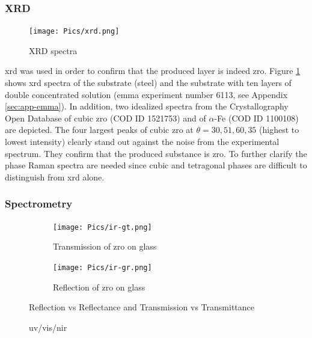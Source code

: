\subsubsection{XRD}
\begin{figure}
	\centering
	\texttt{[image: Pics/xrd.png]}
	\caption{XRD spectra}
	\label{fig:xrd}
\end{figure}

\Gls{xrd} was used in order to confirm that the produced layer is indeed \gls{zro}. 
Figure \ref{fig:xrd} shows \gls{xrd} spectra of the substrate (steel) and 
the substrate with ten layers of double concentrated solution (\gls{emma} experiment number 6113, see Appendix \ref{sec:app-emma}).
In addition, two idealized spectra from the Crystallography Open Database of cubic \gls{zro} (COD ID 1521753\cite{gkatz1971xray}) and of $\alpha$-Fe (COD ID 1100108) are depicted.
%
The four largest peaks of cubic \gls{zro} at $\theta=30, 51, 60, 35$ (highest to lowest intensity) clearly stand out against the noise from the experimental spectrum. %
They confirm that the produced substance is \gls{zro}.
To further clarify the phase Raman spectra are needed since cubic and tetragonal phases are difficult to distinguish from \gls{xrd} alone\cite{Purohit2006Combustion}.

\subsubsection{Spectrometry}

\begin{figure}[htb]
    \centering
    \begin{subfigure}{.49\textwidth}
        \centering
        \texttt{[image: Pics/ir-gt.png]}
        \caption{Transmission of \gls{zro} on glass} \label{fig:ir-gt}
    \end{subfigure}
    \begin{subfigure}{.49\textwidth}
        \centering
        \texttt{[image: Pics/ir-gr.png]}
        \caption{Reflection of \gls{zro} on glass} \label{fig:ir-gr}
    \end{subfigure}
	\caption{\gls{uv}/\gls{vis}/\gls{nir}} Reflection vs Reflectance and Transmission vs Transmittance\label{fig:ir}
\end{figure}

